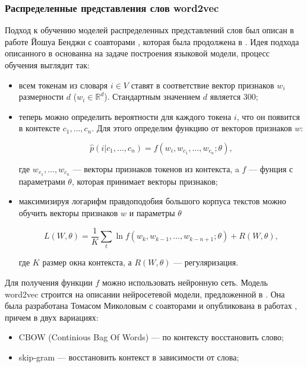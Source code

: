 \subsubsection{Распределенные представления слов word2vec}

Подход к обучению моделей распределенных представлений слов был описан в работе Йошуа Бенджи с соавторами
\cite{Bengio}, которая была продолжена в \cite{Zhou}. Идея подхода описанного в \cite{Bengio} основанна на
задаче построения языковой модели, процесс обучения выглядит так:

\bigskip
\begin{itemize}
 \item всем токенам из словаря $i \in V$ ставят в соответствие вектор признаков $w_i$ размерности $d$ ($w_i
\in \mathds{R}^d$). Стандартным значением $d$ является 300;

 \item теперь можно определить вероятности для каждого токена $i$, что он появится в контексте $c_1, \ldots,
c_n$. Для этого определим функцию от векторов признаков $w$:

 \begin{equation}
  \hat{p}(i|c_1, \ldots, c_n) = f(w_i, w_{c_1}, \ldots, w_{c_n}; \theta),
 \end{equation}

 где $w_{c_1}, \ldots, w_{c_n}$ --- векторы признаков токенов из контекста, a $f$ --- фунция с параметрами
$\theta$, которая принимает векторы признаков;

 \item максимизируя логарифм правдоподобия большого корпуса текстов можно обучить векторы признаков $w$ и
параметры $\theta$

 \begin{equation}
  L(W, \theta) = \frac{1}{K}\sum_t \ln{f(w_k, w_{k-1}, \ldots, w_{k-n+1}; \theta) + R(W, \theta)},
 \end{equation}

 где $K$ размер окна контекста, а $R(W, \theta)$ --- регуляризация.

\end{itemize}

\bigskip
Для получения функции $f$ можно использовать нейронную сеть. Модель word2vec строится на описании
нейросетевой модели, предложенной в \cite{Bengio}. Она была разработана Томасом Миколовым с соавторами и
опубликована в работах \cite{Mikolov:1, Mikolov:2}, причем в двух вариациях:

\bigskip
\begin{itemize}
 \item CBOW (Continious Bag Of Words) --- по контексту восстановить слово;
 \item skip-gram --- восстановить контекст в зависимости от слова;
\end{itemize}

